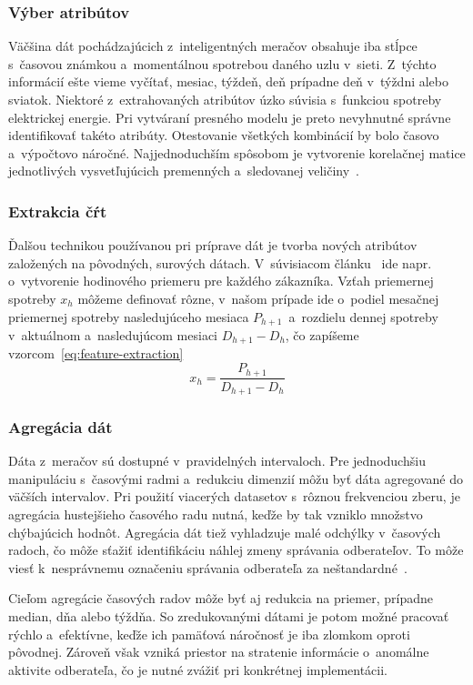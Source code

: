 \documentclass[a4paper,twoside,slovak,12pt,appendix]{article}
\begin{document}
\subsubsection{Výber atribútov}
Väčšina dát pochádzajúcich z~inteligentných meračov obsahuje iba stĺpce
s~časovou známkou a~momentálnou spotrebou daného uzlu v~sieti. Z~týchto
informácií ešte vieme vyčítať, mesiac, týždeň, deň prípadne deň v~týždni alebo
sviatok. Niektoré z~extrahovaných atribútov úzko súvisia s~funkciou spotreby
elektrickej energie. Pri vytváraní presného modelu je preto nevyhnutné správne
identifikovať takéto atribúty. Otestovanie všetkých kombinácií by bolo časovo
a~výpočtovo náročné. Najjednoduchším spôsobom je vytvorenie korelačnej matice
jednotlivých vysvetľujúcich premenných a~sledovanej veličiny~\cite{Cody2015}.

\subsubsection{Extrakcia čŕt}
Ďalšou technikou používanou pri príprave dát je tvorba nových atribútov
založených na pôvodných, surových dátach. V~súvisiacom článku~\cite{Nagi2008}
ide napr. o~vytvorenie hodinového priemeru pre každého zákazníka. Vzťah
priemernej spotreby $x_h$ môžeme definovať rôzne, v~našom prípade ide o~podiel
mesačnej priemernej spotreby nasledujúceho mesiaca $P_{h+1}$~a~rozdielu dennej
spotreby v~aktuálnom a~nasledujúcom mesiaci $D_{h+1} - D_{h}$, čo zapíšeme
vzorcom~\ref{eq:feature-extraction}
\begin{equation}
	\label{eq:feature-extraction}
  x_h = \frac{P_{h+1}}{D_{h+1} - D_{h}}
\end{equation}

\subsubsection{Agregácia dát}
Dáta z~meračov sú dostupné v~pravidelných intervaloch. Pre jednoduchšiu
manipuláciu s~časovými radmi a~redukciu dimenzií môžu byť dáta agregované do
väčších intervalov. Pri použití viacerých datasetov s~rôznou frekvenciou zberu,
je agregácia hustejšieho časového radu nutná, keďže by tak vzniklo množstvo
chýbajúcich hodnôt. Agregácia dát tiež vyhladzuje malé odchýlky v~časových
radoch, čo môže sťažiť identifikáciu náhlej zmeny správania odberateľov. To môže
viesť k~nesprávnemu označeniu správania odberateľa za
neštandardné~\cite{Cody2015}.

Cieľom agregácie časových radov môže byť aj redukcia na priemer, prípadne
median, dňa alebo týždňa. So zredukovanými dátami je potom možné pracovať rýchlo
a~efektívne, keďže ich pamäťová náročnosť je iba zlomkom oproti pôvodnej.
Zároveň však vzniká priestor na stratenie informácie o~anomálne aktivite
odberateľa, čo je nutné zvážiť pri konkrétnej implementácii.
\end{document}
